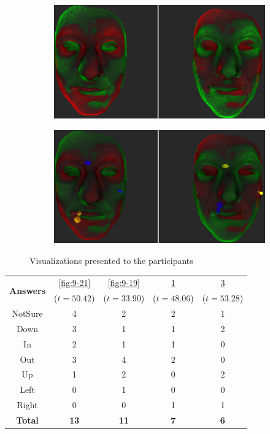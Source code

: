 \begin{figure}[h]
\begin{subfigure}{0.4\textwidth}
\includegraphics[width=\textwidth]{./screenshots/pair20.PNG}
\caption{}
\label{fig:9-20}
\end{subfigure}
\quad
\begin{subfigure}{0.4\textwidth}
\includegraphics[width=\textwidth]{./screenshots/pair24.PNG}
\caption{}
\label{fig:9-24}
\end{subfigure}
\caption{Visualizations presented to the participants}
\end{figure}
\medskip
\begin{center}
\begin{tabular}{| c | c | c | c | c |}
	\hline
\multirow{2}{*}{\bf Answers} & \ref{fig:9-21} & \ref{fig:9-19} & \ref{fig:9-20} & \ref{fig:9-24}\\
	&  (\(t=50.42\)) &  (\(t=33.90\)) &  (\(t=48.06\)) &  (\(t=53.28\))\\ \hline
	NotSure & 4 & 2 & 2 & 1\\ \hline
	Down & 3 & 1 & 1 & 2\\ \hline
	In & 2 & 1 & 1 & 0\\ \hline
	Out & 3 & 4 & 2 & 0\\ \hline
	Up & 1 & 2 & 0 & 2\\ \hline
	Left & 0 & 1 & 0 & 0\\ \hline
	Right & 0 & 0 & 1 & 1\\ \hline
	{\bf Total} & {\bf 13} & {\bf 11} & {\bf 7} & {\bf 6}\\ \hline
\end{tabular}
\end{center}
\clearpage

